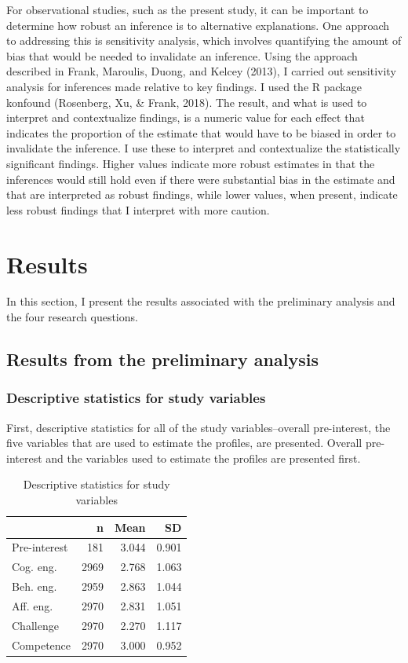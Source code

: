 \documentclass[]{book}
\theoremstyle{definition}
\theoremstyle{definition}
\theoremstyle{definition}
\theoremstyle{remark}
\begin{document}
For observational studies, such as the present study, it can be
important to determine how robust an inference is to alternative
explanations. One approach to addressing this is sensitivity analysis,
which involves quantifying the amount of bias that would be needed to
invalidate an inference. Using the approach described in Frank,
Maroulis, Duong, and Kelcey (2013), I carried out sensitivity analysis
for inferences made relative to key findings. I used the R package
konfound (Rosenberg, Xu, \& Frank, 2018). The result, and what is used
to interpret and contextualize findings, is a numeric value for each
effect that indicates the proportion of the estimate that would have to
be biased in order to invalidate the inference. I use these to interpret
and contextualize the statistically significant findings. Higher values
indicate more robust estimates in that the inferences would still hold
even if there were substantial bias in the estimate and that are
interpreted as robust findings, while lower values, when present,
indicate less robust findings that I interpret with more caution.

\chapter{Results}\label{results}

In this section, I present the results associated with the preliminary
analysis and the four research questions.

\section{Results from the preliminary
analysis}\label{results-from-the-preliminary-analysis}

\subsection{Descriptive statistics for study
variables}\label{descriptive-statistics-for-study-variables}

First, descriptive statistics for all of the study variables--overall
pre-interest, the five variables that are used to estimate the profiles,
are presented. Overall pre-interest and the variables used to estimate
the profiles are presented first.

\begin{table}

\caption{\label{tab:unnamed-chunk-7}Descriptive statistics for study variables}
\centering
\begin{tabular}[t]{lrrr}
\toprule
 & n & Mean & SD\\
\midrule
Pre-interest & 181 & 3.044 & 0.901\\
Cog. eng. & 2969 & 2.768 & 1.063\\
Beh. eng. & 2959 & 2.863 & 1.044\\
Aff. eng. & 2970 & 2.831 & 1.051\\
Challenge & 2970 & 2.270 & 1.117\\
Competence & 2970 & 3.000 & 0.952\\
\bottomrule
\end{tabular}
\end{table}
\end{document}
